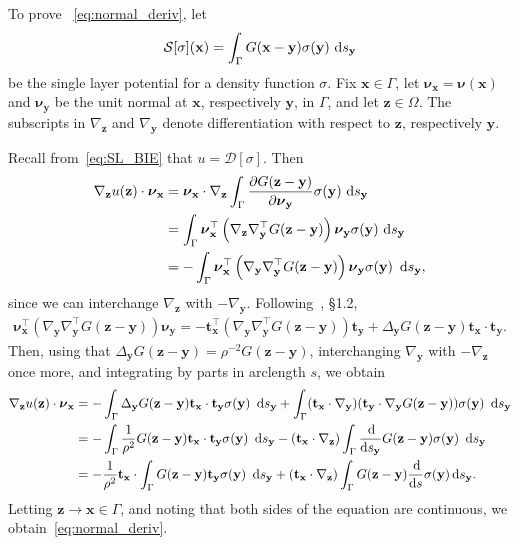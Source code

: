 \documentclass[prb,preprint,showpacs,preprintnumbers,amsmath,amssymb,longbibliography]{revtex4-1}
\newcommand{\nnu}{\boldsymbol{\nu}}
\newcommand{\xx}{\mathbf{x}}
\newcommand{\zz}{\mathbf{z}}
\newcommand{\yy}{\mathbf{y}}
\renewcommand{\tt}{\mathbf{t}}
\begin{document}
To prove ~\eqref{eq:normal_deriv}, let
\begin{equation}
  \label{eq:SLP}
  \mathcal{S}[\sigma](\xx) = \int_\Gamma G(\xx-\yy) \sigma(\yy)\, \dif s_\yy
\end{equation}
be the single layer potential for a density function $\sigma.$ Fix $\xx
\in \Gamma$, let $\nnu_{\xx} = \nnu(\xx)$ and $\nnu_{\yy}$ be the unit
normal at $\xx$, respectively $\yy$, in $\Gamma$, and let $\zz \in
\Omega$. The subscripts in $\nabla_{\zz}$ and $\nabla_{\yy}$ denote
differentiation with respect to $\zz$, respectively $\yy$.

Recall from~\eqref{eq:SL_BIE} that $u = \mathcal{D}[\sigma]$.
Then  
\begin{align*}
\nabla_{\zz} u(\zz) \cdot \nnu_{\xx}
&=\nnu_\xx \cdot \nabla_\zz \int_\Gamma \frac{\partial G(\zz-\yy)}{\partial \nnu_\yy}\sigma(\yy) \,\dif s_\yy\\
&=\int_\Gamma \nnu_\xx^\top \left(\nabla_\zz\nabla_\yy^\top  G(\zz-\yy)\right) \nnu_\yy\sigma(\yy)  \,\dif s_\yy\\
  &=-\int_\Gamma \nnu_\xx^\top \left(\nabla_\yy\nabla_\yy^\top G(\zz-\yy)\right)\nnu_\yy\sigma(\yy)\ \dif s_\yy,
\end{align*}
since we can interchange $\nabla_\zz$ with $-\nabla_\yy$.
Following~\citet{Hsiao2008}, \S 1.2,
\begin{align}
\nnu_\xx^\top \left(\nabla_\yy\nabla_\yy^\top G(\zz-\yy)\right)\nnu_\yy
=
-\tt_{\xx}^\top \left(\nabla_\yy\nabla_\yy^\top G(\zz-\yy)\right)\tt_{\yy}
+ \Delta_{\yy}G(\zz-\yy) \tt_{\xx}\cdot \tt_{\yy}.
\end{align}
Then, using that $\Delta_{\yy} G(\zz-\yy) = \rho^{-2} G(\zz-\yy)$,
interchanging $\nabla_\yy$ with $-\nabla_\zz$ once more, and integrating
by parts in arclength $s$, we obtain 
\begin{align*}
\nabla_{\zz} u(\zz) \cdot \nnu_{\xx}
&=-\int_\Gamma  \Delta_\yy G(\zz-\yy) {\bf t}_\xx \cdot   {\bf t}_\yy \sigma(\yy)\ \dif s_\yy
+\int_\Gamma({\bf t}_\xx\cdot\nabla_\yy)({\bf t}_\yy\cdot\nabla_\yy G(\zz-\yy))\sigma(\yy)\ \dif s_\yy\\
&= -\int_\Gamma \frac{1}{\rho^{2}} G(\zz-\yy) {\bf t}_\xx \cdot {\bf t}_\yy \sigma(\yy)\ \dif s_\yy  
-({\bf t}_\xx\cdot\nabla_\zz)\int_\Gamma \frac{\dif}{\dif s_\yy}G(\zz-\yy) \sigma(\yy)\ \dif s_\yy\\
&= -\frac{1}{\rho^2} {\bf t}_\xx\cdot \int_\Gamma G(\zz-\yy){\bf t}_\yy \sigma(\yy)\ \dif s_\yy + 
({\bf t}_\xx \cdot \nabla_\zz)\int_\Gamma G(\zz-\yy)\frac{\dif }{\dif s} \sigma(\yy)  \dif s_\yy.
\end{align*}
%
Letting $\zz\to\xx\in\Gamma$, and noting that both sides of the equation
are continuous, we obtain~\eqref{eq:normal_deriv}.
\end{document}
